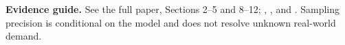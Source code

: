 \documentclass[10pt,letterpaper]{article}
\begin{document}
{\footnotesize\textbf{Evidence guide.} See the full paper, Sections 2--5 and 8--12; , ,  and . Sampling precision is conditional on the model and does not resolve unknown real-world demand.}
\end{document}
